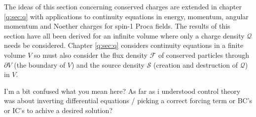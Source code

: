 The ideas of this section concerning conserved charges are extended in chapter \ref{q:sec:q} with applications to continuity equations in energy, momentum, angular momentum and Noether charges for spin-1 Proca fields. The results of this section have all been derived for an infinite volume where only a charge density $\mathcal{Q}$ needs be considered. Chapter \ref{q:sec:q} considers continuity equations in a finite volume $V$ so must also consider the flux density $\mathcal{F}$ of conserved particles through $\partial V$ (the boundary of $V$) and the source density $\mathcal{S}$ (creation and destruction of $\mathcal{Q}$) in $V$. 

\color{choral} I'm a bit confused what you mean here? As far as i understood control theory was about inverting differential equations / picking a correct forcing term or BC's or IC's to achive a desired solution? \color{black}

